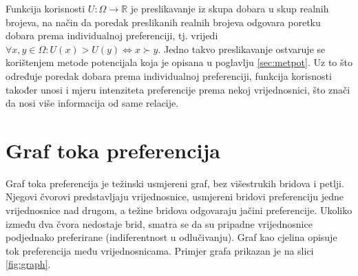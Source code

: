 \documentclass[lmodern, utf8, diplomski, numeric]{fer}
\begin{document}
  Funkcija korisnosti  $U\colon \Omega \to \mathbb{R}$ je preslikavanje iz skupa dobara u skup realnih brojeva, na način da poredak preslikanih realnih brojeva odgovara poretku dobara prema individualnoj preferenciji, tj. vrijedi $\forall x, y \in \Omega \colon U(x) > U(y) \Leftrightarrow x \succ y$.
  Jedno takvo preslikavanje ostvaruje se korištenjem metode potencijala koja je opisana u poglavlju \ref{sec:metpot}.
  Uz to što određuje poredak dobara prema individualnoj preferenciji, funkcija korisnosti također unosi i mjeru intenziteta preferencije prema nekoj vrijednosnici, što znači da nosi više informacija od same relacije.

  \section{Graf toka preferencija}
  
  Graf toka preferencija je težinski usmjereni graf, bez višestrukih bridova i petlji.
  Njegovi čvorovi predstavljaju vrijednosnice, usmjereni bridovi preferenciju jedne vrijednosnice nad drugom, a težine bridova odgovaraju jačini preferencije.
  Ukoliko između dva čvora nedostaje brid, smatra se da su pripadne vrijednosnice podjednako preferirane (indiferentnost u odlučivanju).
  Graf kao cjelina opisuje tok preferencija među vrijednosnicama.
  Primjer grafa prikazan je na slici \ref{fig:graph}.
  
\end{document}
